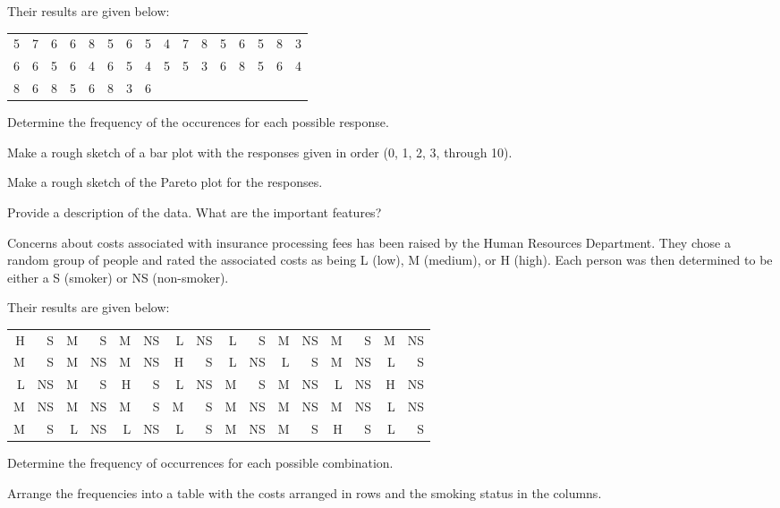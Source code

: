 \begin{problem}
  Their results are given below:\\
  \begin{tabular}{rrrrrrrrrrrrrrrr}
    5 & 7 & 6 & 6 & 8 & 5 & 6 & 5 &
    4 & 7 & 8 & 5 & 6 & 5 & 8 & 3 \\
    6 & 6 & 5 & 6 & 4 & 6 & 5 & 4 &
    5 & 5 & 3 & 6 & 8 & 5 & 6 & 4 \\
    8 & 6 & 8 & 5 & 6 & 8 & 3 & 6 
  \end{tabular}

  \begin{subproblem}
  \item Determine the frequency of the occurences for each possible
    response.
    \vfill
  \item Make a rough sketch of a bar plot with the responses given in
    order (0, 1, 2, 3, through 10).
    \vfill
    \clearpage
  \item Make a rough sketch of the Pareto plot for the responses.
    \vfill
  \item Provide a description of the data. What are the important features?
    \vspace{5em}
  \end{subproblem}

\clearpage

\item Concerns about costs associated with insurance processing fees
  has been raised by the Human Resources Department. They chose a
  random group of people and rated the associated costs as being L
  (low), M (medium), or H (high). Each person was then determined to
  be either a S (smoker) or NS (non-smoker).

  Their results are given below:\\
  \begin{tabular}{rr|rr|rr|rr|rr|rr|rr|rr}
    H & S  & M & S  & M & NS & L & NS & L & S  & M & NS & M & S  & M & NS  \\
    M & S  & M & NS & M & NS & H & S  & L & NS & L & S  & M & NS & L & S  \\
    L & NS & M & S  & H & S  & L & NS & M & S  & M & NS & L & NS & H & NS \\
    M & NS & M & NS & M & S  & M & S  & M & NS & M & NS & M & NS & L & NS \\
    M & S  & L & NS & L & NS & L & S  & M & NS & M & S  & H & S  & L & S 
  \end{tabular}

  \begin{subproblem}
    \item Determine the frequency of occurrences for  each possible
      combination.
      \vfill
    \item Arrange the frequencies into a table with the costs arranged
      in rows and the smoking status in the columns.
      \vfill
  \end{subproblem}
  
\end{problem}

